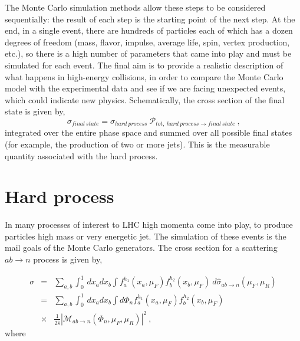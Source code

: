 The Monte Carlo simulation methods allow these steps to be considered sequentially: the result of each step is the starting point of the next step.
At the end, in a single event, there are hundreds of particles each of which has a dozen degrees of freedom (mass, flavor, impulse, average life, spin, vertex production, etc.), so there is a  high number of parameters that came into play and must be simulated for each event.
The final aim is to provide a realistic description of what happens in high-energy collisions, in order to compare the Monte Carlo model with the experimental data and see if we are facing unexpected events, which could indicate new physics.
Schematically, the cross section of the final state is given by,
\begin{equation}
 \sigma_{final \: state}=\sigma_{hard \: process} \: \mathcal{P}_{tot, \:hard \: process \rightarrow final \:state} \: \mbox{,}\end{equation}
integrated over the entire phase space and summed over all possible final states (for example, the production of two or more jets). This is the measurable quantity associated with the hard process. \\




\section{Hard process}

In many processes of interest to LHC high momenta come into play, to produce particles  high mass or very energetic jet. The simulation of these events is the mail goals of the Monte Carlo generators.
The cross section for a scattering $ ab \rightarrow n $ process is given \cite{Buckley:2011ms} by,

\begin{eqnarray}
 \sigma & = & \sum_{a,b}  \int_{0}^{1} \, dx_{a} dx_b \int f_{a}^{h_1} (x_a , \mu_F) f_{b}^{h_2} (x_b , \mu_F) \: d \hat{\sigma}_{ab \rightarrow n}(\mu_F , \mu_R)  \nonumber \\
& = & \sum_{a,b}  \int_{0}^{1} \, dx_{a} dx_b \int d \Phi_n  f_{a}^{h_1} (x_a , \mu_F) f_{b}^{h_2} (x_b , \mu_F) \nonumber \\
 & \times& \frac{1}{2\hat{s}} 
 | \mathcal{M}_{ab \rightarrow n} 
(\Phi_n , \mu_F , \mu_R)|^2  \: \mbox{,} \end{eqnarray}
where




